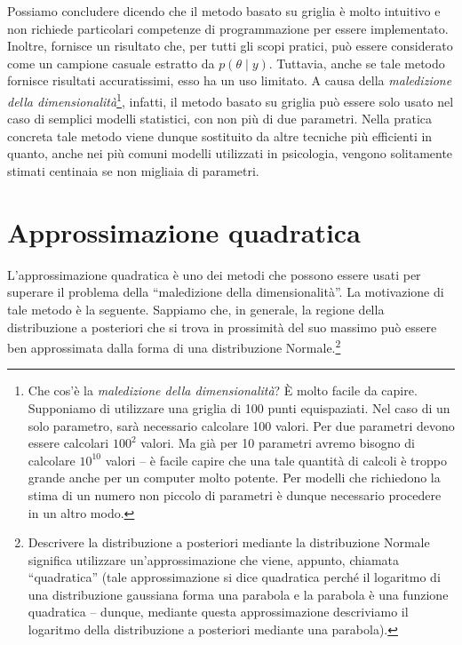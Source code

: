 \documentclass[
]{memoir}
\begin{document}
Possiamo concludere dicendo che il metodo basato su griglia è molto intuitivo e non richiede particolari competenze di programmazione per essere implementato. Inoltre, fornisce un risultato che, per tutti gli scopi pratici, può essere considerato come un campione casuale estratto da \(p(\theta \mid y)\). Tuttavia, anche se tale metodo fornisce risultati accuratissimi, esso ha un uso limitato. A causa della \emph{maledizione della dimensionalità}\footnote{Che cos'è la \emph{maledizione della dimensionalità}? È molto facile da capire. Supponiamo di utilizzare una griglia di 100 punti equispaziati. Nel caso di un solo parametro, sarà necessario calcolare 100 valori. Per due parametri devono essere calcolari \(100^2\) valori. Ma già per 10 parametri avremo bisogno di calcolare \(10^{10}\) valori -- è facile capire che una tale quantità di calcoli è troppo grande anche per un computer molto potente. Per modelli che richiedono la stima di un numero non piccolo di parametri è dunque necessario procedere in un altro modo.}, infatti, il metodo basato su griglia può essere solo usato nel caso di semplici modelli statistici, con non più di due parametri. Nella pratica concreta tale metodo viene dunque sostituito da altre tecniche più efficienti in quanto, anche nei più comuni modelli utilizzati in psicologia, vengono solitamente stimati centinaia se non migliaia di parametri.

\hypertarget{approssimazione-quadratica}{%
\section{Approssimazione quadratica}\label{approssimazione-quadratica}}

L'approssimazione quadratica è uno dei metodi che possono essere usati per superare il problema della ``maledizione della dimensionalità''. La motivazione di tale metodo è la seguente. Sappiamo che, in generale, la regione della distribuzione a posteriori che si trova in prossimità del suo massimo può essere ben approssimata dalla forma di una distribuzione Normale.\footnote{Descrivere la distribuzione a posteriori mediante la distribuzione Normale significa utilizzare un'approssimazione che viene, appunto, chiamata ``quadratica'' (tale approssimazione si dice quadratica perché il logaritmo di una distribuzione gaussiana forma una parabola e la parabola è una funzione quadratica -- dunque, mediante questa approssimazione descriviamo il logaritmo della distribuzione a posteriori mediante una parabola).}
\end{document}
